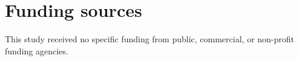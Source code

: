 \documentclass[final,5p,times,twocolumn]{elsarticle}
\begin{document}
\section*{Funding sources}
This study received no specific funding from public, commercial, or non-profit funding agencies.
 






\end{document}
